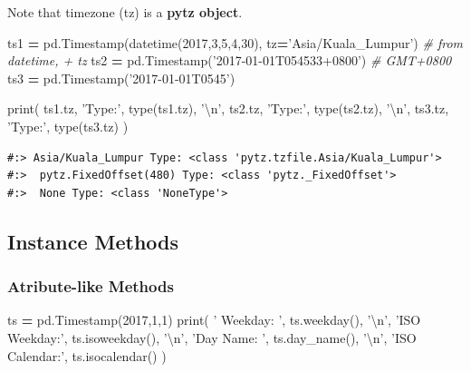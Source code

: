 \documentclass[
]{book}
\newenvironment{Shaded}{\begin{snugshade}}{\end{snugshade}}
\newcommand{\BuiltInTok}[1]{#1}
\newcommand{\CharTok}[1]{\textcolor[rgb]{0.5,0.5,0.5}{#1}}
\newcommand{\CommentTok}[1]{\textcolor[rgb]{0.37,0.37,0.37}{\textit{#1}}}
\newcommand{\DecValTok}[1]{\textcolor[rgb]{0.06,0.06,0.06}{#1}}
\newcommand{\NormalTok}[1]{#1}
\newcommand{\OperatorTok}[1]{\textcolor[rgb]{0.43,0.43,0.43}{\textbf{#1}}}
\newcommand{\StringTok}[1]{\textcolor[rgb]{0.5,0.5,0.5}{#1}}
\begin{document}
Note that timezone (tz) is a \textbf{pytz object}.

\begin{Shaded}
\begin{Highlighting}[]
\NormalTok{ts1 }\OperatorTok{=}\NormalTok{ pd.Timestamp(datetime(}\DecValTok{2017}\NormalTok{,}\DecValTok{3}\NormalTok{,}\DecValTok{5}\NormalTok{,}\DecValTok{4}\NormalTok{,}\DecValTok{30}\NormalTok{), tz}\OperatorTok{=}\StringTok{'Asia/Kuala_Lumpur'}\NormalTok{)   }\CommentTok{# from datetime, + tz}
\NormalTok{ts2 }\OperatorTok{=}\NormalTok{ pd.Timestamp(}\StringTok{'2017-01-01T054533+0800'}\NormalTok{) }\CommentTok{# GMT+0800}
\NormalTok{ts3 }\OperatorTok{=}\NormalTok{ pd.Timestamp(}\StringTok{'2017-01-01T0545'}\NormalTok{)}

\BuiltInTok{print}\NormalTok{( ts1.tz, }\StringTok{'Type:'}\NormalTok{, }\BuiltInTok{type}\NormalTok{(ts1.tz), }\StringTok{'}\CharTok{\textbackslash{}n}\StringTok{'}\NormalTok{,}
\NormalTok{       ts2.tz, }\StringTok{'Type:'}\NormalTok{, }\BuiltInTok{type}\NormalTok{(ts2.tz), }\StringTok{'}\CharTok{\textbackslash{}n}\StringTok{'}\NormalTok{,}
\NormalTok{       ts3.tz, }\StringTok{'Type:'}\NormalTok{, }\BuiltInTok{type}\NormalTok{(ts3.tz)  )}
\end{Highlighting}
\end{Shaded}

\begin{verbatim}
#:> Asia/Kuala_Lumpur Type: <class 'pytz.tzfile.Asia/Kuala_Lumpur'> 
#:>  pytz.FixedOffset(480) Type: <class 'pytz._FixedOffset'> 
#:>  None Type: <class 'NoneType'>
\end{verbatim}

\hypertarget{instance-methods-1}{%
\subsection{Instance Methods}\label{instance-methods-1}}

\hypertarget{atribute-like-methods}{%
\subsubsection{Atribute-like Methods}\label{atribute-like-methods}}

\begin{Shaded}
\begin{Highlighting}[]
\NormalTok{ts }\OperatorTok{=}\NormalTok{ pd.Timestamp(}\DecValTok{2017}\NormalTok{,}\DecValTok{1}\NormalTok{,}\DecValTok{1}\NormalTok{)}
\BuiltInTok{print}\NormalTok{( }\StringTok{' Weekday:    '}\NormalTok{, ts.weekday(), }\StringTok{'}\CharTok{\textbackslash{}n}\StringTok{'}\NormalTok{,}
       \StringTok{'ISO Weekday:'}\NormalTok{,  ts.isoweekday(), }\StringTok{'}\CharTok{\textbackslash{}n}\StringTok{'}\NormalTok{,}
       \StringTok{'Day Name:   '}\NormalTok{,  ts.day_name(), }\StringTok{'}\CharTok{\textbackslash{}n}\StringTok{'}\NormalTok{,}
       \StringTok{'ISO Calendar:'}\NormalTok{,  ts.isocalendar()}
\NormalTok{       )}
\end{Highlighting}
\end{Shaded}
\end{document}
